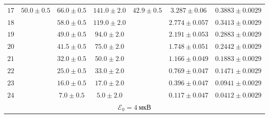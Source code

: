 \begin{tabular}{|c|c|c|c|c|c|c|}
  $17$ & \multirow{8}{*}{$50.0 \pm 0.5$}\
                   & $66.0 \pm 0.5$ & $141.0 \pm 2.0$ & \multirow{8}{*}{$42.9 \pm 0.5$}\
                                                               & $3.287 \pm 0.06$ & $0.3883 \pm 0.0029$\\ \cline{1-1} \cline{3-4} \cline{6-7}
  $18$ & & $58.0 \pm 0.5$ & $119.0 \pm 2.0$ & & $2.774 \pm 0.057$ & $0.3413 \pm 0.0029$\\ \cline{1-1} \cline{3-4} \cline{6-7}
  $19$ & & $49.0 \pm 0.5$ & $94.0 \pm 2.0$ & & $2.191 \pm 0.053$ & $0.2883 \pm 0.0029$\\ \cline{1-1} \cline{3-4} \cline{6-7}
  $20$ & & $41.5 \pm 0.5$ & $75.0 \pm 2.0$ & & $1.748 \pm 0.051$ & $0.2442 \pm 0.0029$\\ \cline{1-1} \cline{3-4} \cline{6-7}
  $21$ & & $32.0 \pm 0.5$ & $50.0 \pm 2.0$ & & $1.166 \pm 0.049$ & $0.1883 \pm 0.0029$\\ \cline{1-1} \cline{3-4} \cline{6-7}
  $22$ & & $25.0 \pm 0.5$ & $33.0 \pm 2.0$ & & $0.769 \pm 0.047$ & $0.1471 \pm 0.0029$\\ \cline{1-1} \cline{3-4} \cline{6-7}
  $23$ & & $16.0 \pm 0.5$ & $17.0 \pm 2.0$ & & $0.396 \pm 0.047$ & $0.0941 \pm 0.0029$\\ \cline{1-1} \cline{3-4} \cline{6-7}
  $24$ & & $7.0 \pm 0.5$ & $5.0 \pm 2.0$ & & $0.117 \pm 0.047$ & $0.0412 \pm 0.0029$\\ \hline
  \multicolumn{7}{|c|}{$\mathscr{E}_{0} = 4\ мкВ$} \\ \hline
\end{tabular}
